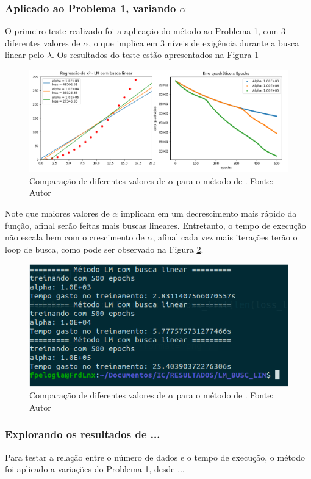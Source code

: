 \documentclass[11pt]{article}
\begin{document}
\subsubsection*{Aplicado ao Problema 1, variando $\alpha$}
O primeiro teste realizado foi a aplicação do método ao Problema 1, com 3 diferentes valores de $\alpha$, o que implica em 3 níveis de exigência durante a busca linear pelo $\lambda$. Os resultados do teste estão apresentados na Figura \ref{LMBL_SQ} 
\begin{figure}[H]
\center
\includegraphics[scale=0.5]{Figuras/REG_lmbl.png}
\caption{Comparação de diferentes valores de $\alpha$ para o método de \cite{bmLS}. Fonte: Autor} 
\label{LMBL_SQ}
\end{figure}
Note que maiores valores de $\alpha$ implicam em um decrescimento mais rápido da função, afinal serão feitas mais buscas lineares. Entretanto, o tempo de execução não escala bem com o crescimento de $\alpha$, afinal cada vez mais iterações terão o loop de busca, como pode ser observado na Figura \ref{LMBL_time}.
\begin{figure}[H]
\center
\includegraphics[scale=0.6]{Figuras/lmbl_square_t.png}
\caption{Comparação de diferentes valores de $\alpha$ para o método de \cite{bmLS}. Fonte: Autor} 
\label{LMBL_time}
\end{figure}

\subsubsection*{Explorando os resultados de ...}
Para testar a relação entre o número de dados e o tempo de execução, o método foi aplicado a variações do Problema 1, desde ...
\end{document}
